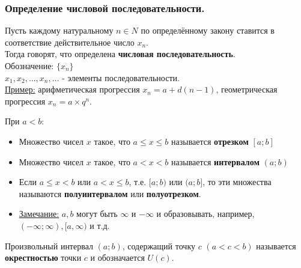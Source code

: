 \documentclass[12pt]{article}
\begin{document}
    \subsubsection*{Определение числовой последовательности.}
    \noindent Пусть каждому натуральному $n \in N$ по определённому закону ставится в соответствие действительное число $x_n$.\\
    Тогда говорят, что определена \textbf{числовая последовательность}.\\
    Обозначение: $\{x_n\}$\\
    $x_{1}, x_{2}, \dots, x_n, \dots$ - элементы последовательности.\\
    \underline{Пример:} арифметическая прогрессия $x_n = a + d(n-1)$, геометрическая прогрессия $x_n = a \times q^n$.\par\noindent
    При $a < b$:
    \begin{itemize}
        \item Множество чисел $x$ такое, что $a \le x \le b$ называется \textbf{отрезком} $[a; b]$
        \item Множество чисел $x$ такое, что $a < x < b$ называется \textbf{интервалом} $(a; b)$
        \item Если $a \le x < b$ или $a < x \le b$, т.е. $[a; b)$ или $(a; b]$, то эти множества называются \textbf{полуинтервалом} или \textbf{полуотрезком}.
        \item \underline{Замечание:} $a, b$ могут быть $\infty$ и $-\infty$ и образовывать, например, $(-\infty; \infty), [a, \infty)$ и т.д.
    \end{itemize}
    Произвольный интервал $(a; b)$, содержащий точку $c$ $(a < c < b)$ называется \textbf{окрестностью} точки $c$ и обозначается $U(c)$.
\end{document}
